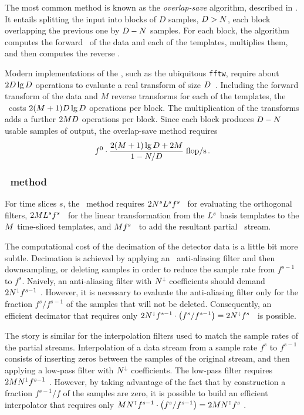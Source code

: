 The most common \FD{} method is known as the \emph{overlap-save} algorithm, described in
\citet{numerical-recipes-chapter-13}.  It entails splitting the input into blocks of $D$
samples, $D > N$, each block overlapping the previous one by $D - N$
samples.  For each block, the algorithm computes the forward \fft\ of the data and
each of the templates, multiplies them, and then computes the reverse \fft.

Modern implementations of the \fft, such as the ubiquitous \texttt{fftw}, require about
$2 D \lg D$ operations to evaluate a real transform of size
$D$~\citep{Johnson:2007p9654}.  Including the forward transform of the data and
$M$ reverse transforms for each of the templates, the \fft\ costs $2 (M + 1)
D \lg D$ operations per block.  The multiplication of the transforms adds
a further $2 M D$ operations per block.  Since each block produces
$D - N$ usable samples of output, the overlap-save method requires
$$
f^0 \cdot \frac{2 (M + 1) \lg D + 2 M}{1 - N/D} \; \mathrm{flop/s} \,.
$$

\subsubsection{\lloid\ method}

For time slices $s$, the \lloid\ method requires $2 N^s L^s f^s$ \flops\ 
for evaluating the orthogonal filters, $2 M L^s f^s$ \flops\ for the 
linear transformation from the $L^s$ basis templates to the $M$ time-sliced templates, and $M f^s$ \flops\ to add the resultant partial \SNR\ stream.

The computational cost of the decimation of the detector data is a little bit more subtle.  Decimation is achieved by applying an \fir\ anti-aliasing filter and then downsampling, or deleting samples in order to reduce the sample rate from $f^{s-1}$ to $f^s$.  Naively, an anti-aliasing filter with $N^\shortdownarrow$ coefficients should demand $2 N^\shortdownarrow f^{s-1}$ \flops.  However, it is necessary to evaluate the anti-aliasing filter only for the fraction $f^s / f^{s-1}$ of the samples that will not be deleted.  Consequently, an efficient decimator that requires only $2 N^\shortdownarrow f^{s-1} \cdot \left( f^s / f^{s-1} \right) = 2 N^\shortdownarrow f^s$ \flops\ is possible.

The story is similar for the interpolation filters used to match the sample rates of the partial \SNR{} streams.  Interpolation of a data stream from a sample rate $f^s$ to $f^{s-1}$ consists of inserting zeros between the samples of the original stream, and then applying a low-pass filter with $N^\shortdownarrow$ coefficients.  The low-pass filter requires $2 M N^\shortdownarrow f^{s-1}$ \flops.  However, by taking advantage of the fact that by construction a fraction $f^{s-1}/f$ of the samples are zero, it is possible to build an efficient interpolator that requires only $M N^\shortuparrow f^{s-1} \cdot \left( f^s / f^{s-1} \right) = 2 M N^\shortuparrow f^s$ \flops.

